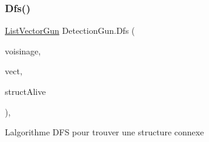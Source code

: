 \subsubsection{\texorpdfstring{Dfs()}{Dfs()}}
{\footnotesize\ttfamily \mbox{\hyperlink{class_list_vector_gun}{List\+Vector\+Gun}} Detection\+Gun.\+Dfs (\begin{DoxyParamCaption}\item[{Voisinage2}]{voisinage,  }\item[{Vector3}]{vect,  }\item[{\mbox{\hyperlink{class_list_vector_gun}{List\+Vector\+Gun}}}]{struct\+Alive }\end{DoxyParamCaption})\hspace{0.3cm}{\ttfamily [inline]}, {\ttfamily [private]}}



L\textquotesingle{}algorithme D\+FS pour trouver une structure connexe 



